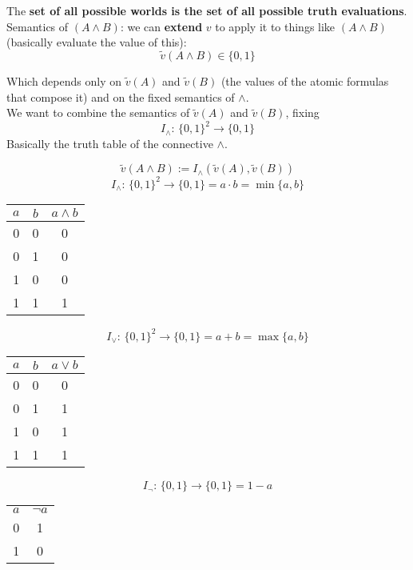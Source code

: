 \documentclass[11pt]{article}
\begin{document}
	The \textbf{set of all possible worlds is the set of all possible truth evaluations}.\\
	
	Semantics of $(A\wedge B)$: we can \textbf{extend} $v$ to apply it to things like $(A\wedge B)$ (basically evaluate the value of this):
	$$ \tilde{v} (A\wedge B) \in \{0,1\}$$
	
	Which depends only on $\tilde{v}(A)$ and $\tilde{v}(B)$ (the values of the atomic formulas that compose it) and on the fixed semantics of $\wedge$.\\
	
	We want to combine the semantics of  $\tilde{v}(A)$ and $\tilde{v}(B)$, fixing 
	$$ I_{\wedge} : \, \{0,1\}^2 \rightarrow \{0,1\} $$
	Basically the truth table of the connective $\wedge$.
	
	\newpage
	
	$$ \tilde{v}(A \wedge B) := I_\wedge (\tilde{v}(A),  \tilde{v}(B))$$
	$$ I_{\wedge} : \, \{0,1\}^2 \rightarrow \{0,1\}  = a \cdot b = \min \{a,b\} $$
	\begin{center}
		\begin{tabular}{c c | c}
			$a$ & $b$ & $a \wedge b$ \\
			\hline 
			0 & 0 & 0 \\
			0 & 1 & 0 \\
			1 & 0 & 0 \\
			1 & 1 & 1
		\end{tabular}
	\end{center}
	
	$$ I_{\vee} : \, \{0,1\}^2 \rightarrow \{0,1\} = a + b = \max \{a,b\} $$
	\begin{center}
		\begin{tabular}{c c | c}
			$a$ & $b$ & $a \vee b$ \\
			\hline 
			0 & 0 & 0 \\
			0 & 1 & 1 \\
			1 & 0 & 1 \\
			1 & 1 & 1
		\end{tabular}
	\end{center}
	
	$$ I_{\neg} : \, \{0,1\} \rightarrow \{0,1\} = 1 - a $$
	\begin{center}
		\begin{tabular}{c | c}
			$a$ & $\neg a$ \\
			0 & 1 \\
			1 & 0
		\end{tabular}
	\end{center}
	
\end{document}
